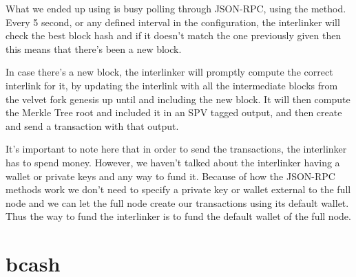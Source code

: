 What we ended up using is busy polling through JSON-RPC, using the  method. Every 5 second, or any defined interval in the configuration, the interlinker will check the best block hash and if it doesn't match the one previously given then this means that there's been a new block.

In case there's a new block, the interlinker will promptly compute the correct interlink for it, by updating the interlink with all the intermediate blocks from the velvet fork genesis up until and including the new block. It will then compute the Merkle Tree root and included it in an SPV tagged output, and then create and send a transaction with that output.

It's important to note here that in order to send the transactions, the interlinker has to spend money. However, we haven't talked about the interlinker having a wallet or private keys and any way to fund it. Because of how the JSON-RPC methods work we don't need to specify a private key or wallet external to the full node and we can let the full node create our transactions using its default wallet. Thus the way to fund the interlinker is to fund the default wallet of the full node.

\section{bcash}

